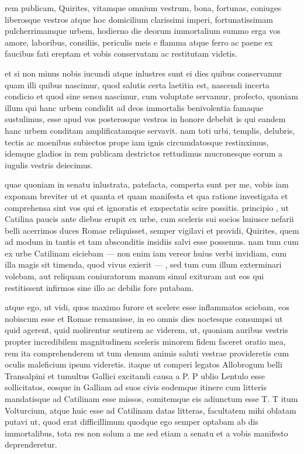 
 rem publicam, Quirites, vitamque omnium vestrum, bona, fortunas, coniuges liberosque vestros atque hoc domicilium clarissimi imperi, fortunatissimam pulcherrimamque urbem, hodierno die deorum immortalium summo erga vos amore, laboribus, consiliis, periculis meis e flamma atque ferro ac paene ex faucibus fati ereptam et vobis conservatam ac restitutam videtis.

 et si non minus nobis iucundi atque inlustres sunt ei dies quibus conservamur quam illi quibus nascimur, quod salutis certa laetitia est, nascendi incerta condicio et quod sine sensu nascimur, cum voluptate servamur, profecto, quoniam illum qui hanc urbem condidit ad deos immortalis benivolentia famaque sustulimus, esse apud vos posterosque vestros in honore debebit is qui eandem hanc urbem conditam amplificatamque servavit. nam toti urbi, templis, delubris, tectis ac moenibus subiectos prope iam ignis circumdatosque restinximus, idemque gladios in rem publicam destrictos rettudimus mucronesque eorum a iugulis vestris deiecimus.

 quae quoniam in senatu inlustrata, patefacta, comperta sunt per me, vobis iam exponam breviter ut et quanta et quam manifesta et qua ratione investigata et comprehensa sint vos qui et ignoratis et exspectatis scire possitis. principio , ut Catilina paucis ante diebus erupit ex urbe, cum sceleris sui socios huiusce nefarii belli acerrimos duces Romae reliquisset, semper vigilavi et providi, Quirites, quem ad modum in tantis et tam absconditis insidiis salvi esse possemus. nam tum cum ex urbe Catilinam eiciebam — non enim iam vereor huius verbi invidiam, cum illa magis sit timenda, quod vivus exierit — , sed tum cum illum exterminari volebam, aut reliquam coniuratorum manum simul exituram aut eos qui restitissent infirmos sine illo ac debilis fore putabam.

 atque ego, ut vidi, quos maximo furore et scelere esse inflammatos sciebam, eos nobiscum esse et Romae remansisse, in eo omnis dies noctesque consumpsi ut quid agerent, quid molirentur sentirem ac viderem, ut, quoniam auribus vestris propter incredibilem magnitudinem sceleris minorem fidem faceret oratio mea, rem ita comprehenderem ut tum demum animis saluti vestrae provideretis cum oculis maleficium ipsum videretis. itaque ut comperi legatos Allobrogum belli Transalpini et tumultus Gallici excitandi causa a P. P ublio Lentulo esse sollicitatos, eosque in Galliam ad suos civis eodemque itinere cum litteris mandatisque ad Catilinam esse missos, comitemque eis adiunctum esse T. T itum Volturcium, atque huic esse ad Catilinam datas litteras, facultatem mihi oblatam putavi ut, quod erat difficillimum quodque ego semper optabam ab dis immortalibus, tota res non solum a me sed etiam a senatu et a vobis manifesto deprenderetur.


